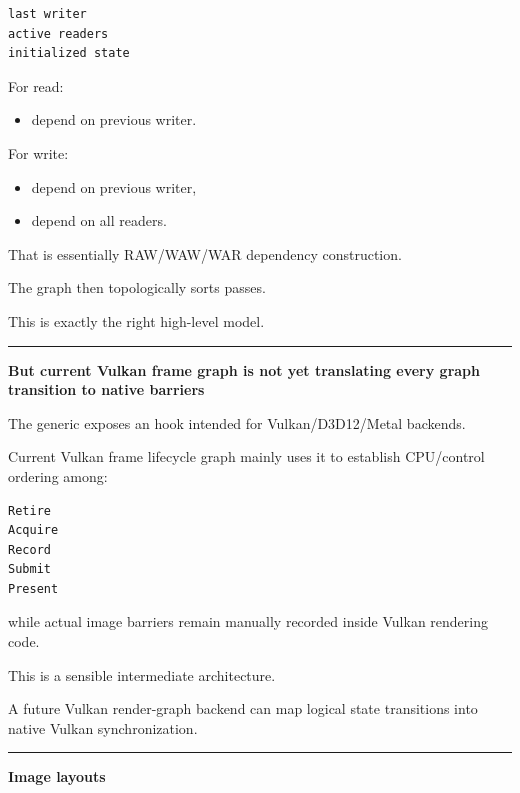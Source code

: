 \begin{verbatim}
last writer
active readers
initialized state
\end{verbatim}

For read:

\begin{itemize}
\tightlist
\item
  depend on previous writer.
\end{itemize}

For write:

\begin{itemize}
\tightlist
\item
  depend on previous writer,
\item
  depend on all readers.
\end{itemize}

That is essentially RAW/WAW/WAR dependency construction.

The graph then topologically sorts passes.

This is exactly the right high-level model.

\begin{center}\rule{0.5\linewidth}{0.5pt}\end{center}

\textbf{But current Vulkan frame graph is not yet translating every graph transition to native barriers}

The generic  exposes an  hook intended for Vulkan/D3D12/Metal backends.

Current Vulkan frame lifecycle graph mainly uses it to establish CPU/control ordering among:

\begin{verbatim}
Retire
Acquire
Record
Submit
Present
\end{verbatim}

while actual image barriers remain manually recorded inside Vulkan rendering code.

This is a sensible intermediate architecture.

A future Vulkan render-graph backend can map logical state transitions into native Vulkan synchronization.

\begin{center}\rule{0.5\linewidth}{0.5pt}\end{center}

\textbf{Image layouts}

